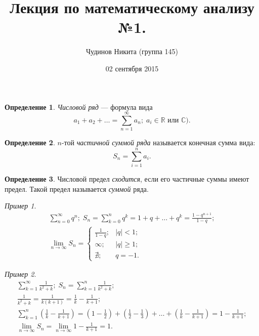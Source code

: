 \documentclass[a4paper,12pt]{article}
\theoremstyle{remark}
\newtheorem*{example}{Пример}
\theoremstyle{definition}
\newtheorem{definition}{Определение}
\begin{document}
\sloppy
\author{Чудинов Никита (группа 145)}
\date{02 сентября 2015}
\title{\vspace{-2.0cm}Лекция по математическому анализу №1.}
\frenchspacing
 
\maketitle


\begin{definition}
\emph{Числовой ряд} --- формула вида
\begin{equation*}
	a_1 + a_2 + \dots = \sum^{\infty}_{n = 1} a_n;\; a_i \in \mathbb{R} \text{ или } \mathbb{C}).
\end{equation*}
\end{definition}

\begin{definition}
\(n\)-той \emph{частичной суммой ряда} называется конечная сумма вида:
\begin{equation*}
	S_n = \sum^{n}_{i = 1} a_i.
\end{equation*}
\end{definition}

\begin{definition}
Числовой предел \emph{сходится}, если его частичные суммы имеют предел. Такой предел называется \emph{суммой} ряда.
\end{definition}

\begin{example}
\begin{gather*}
	\sum^{\infty}_{n = 0} q^n;\; S_n = \sum^{n}_{k = 0} q^k = 1 + q + \dots + q^k = \frac{1 - q^{n+1}}{1-q}; \\
	\lim_{n \rightarrow \infty} S_n = 
	\begin{cases}
		\frac{1}{1 - q}; &|q| < 1; \\
		\infty; &|q| \geqslant 1; \\
		\nexists; &q = -1. 
	\end{cases}
\end{gather*}
\end{example}

\begin{example}
\begin{gather*}
	\sum^{\infty}_{k = 1} \frac{1}{k^2 + k} ;\; S_n = \sum^{n}_{k = 1} \frac{1}{k^2 + k}; \\
	\frac{1}{k^2 + k} = \frac{1}{k (k + 1)} = \frac{1}{k} - \frac{1}{k + 1}; \\
	\sum^{n}_{k = 1} \left(\frac{1}{k} - \frac{1}{k + 1}\right) = \left(1 - \frac{1}{2}\right) + \left(\frac{1}{2} - \frac{1}{3}\right) + \dots + \left(\frac{1}{k} - \frac{1}{k + 1}\right) = 1 - \frac{1}{k + 1}; \\
	\lim_{n \rightarrow \infty} S_n = \lim_{n \rightarrow \infty} 1 - \frac{1}{k + 1} = 1.
\end{gather*}
\end{example}
\end{document}
